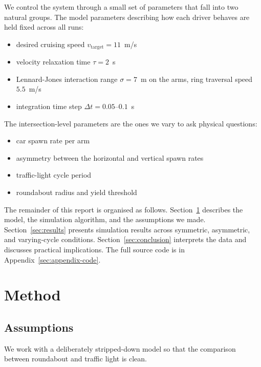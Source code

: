 \documentclass[11pt]{article}
\begin{document}
We control the system through a small set of parameters that fall into two natural groups. The model parameters describing how each driver behaves are held fixed across all runs:
\begin{itemize}
    \item desired cruising speed $v_{\text{target}} = 11$~m/s
    \item velocity relaxation time $\tau = 2$~s
    \item Lennard-Jones interaction range $\sigma = 7$~m on the arms, ring traversal speed $5.5$~m/s
    \item integration time step $\Delta t = 0.05$--$0.1$~s
\end{itemize}

The intersection-level parameters are the ones we vary to ask physical questions:
\begin{itemize}
    \item car spawn rate per arm
    \item asymmetry between the horizontal and vertical spawn rates
    \item traffic-light cycle period
    \item roundabout radius and yield threshold
\end{itemize}

The remainder of this report is organised as follows. Section~\ref{sec:method} describes the model, the simulation algorithm, and the assumptions we made. Section~\ref{sec:results} presents simulation results across symmetric, asymmetric, and varying-cycle conditions. Section~\ref{sec:conclusion} interprets the data and discusses practical implications. The full source code is in Appendix~\ref{sec:appendix-code}.

\section{Method}\label{sec:method}

\subsection{Assumptions}
We work with a deliberately stripped-down model so that the comparison between roundabout and traffic light is clean.
\end{document}
